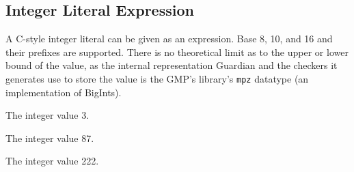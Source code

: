 
\subsection{Integer Literal Expression}
{
	A C-style integer literal can be given as an expression.
	Base 8, 10, and 16 and their prefixes are supported.
	There is no theoretical limit as to the upper or lower bound of the value,
	as the internal representation Guardian and the checkers it generates
	use to store the value
	is the GMP's library's \texttt{mpz} datatype (an implementation of BigInts).
	
	\begin{itemize}
	{
		\item[\texttt{3}] The integer value 3.
		
		\item[\texttt{0127}] The integer value 87.
		
		\item[\texttt{0xDE}] The integer value 222.
	}
	\end{itemize}
}
